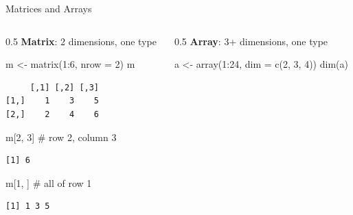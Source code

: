 \documentclass[
  ignorenonframetext,
  aspectratio=169,
]{beamer}
\newenvironment{Shaded}{\begin{snugshade}}{\end{snugshade}}
\newcommand{\AttributeTok}[1]{\textcolor[rgb]{0.40,0.45,0.13}{#1}}
\newcommand{\CommentTok}[1]{\textcolor[rgb]{0.37,0.37,0.37}{#1}}
\newcommand{\DecValTok}[1]{\textcolor[rgb]{0.68,0.00,0.00}{#1}}
\newcommand{\FunctionTok}[1]{\textcolor[rgb]{0.28,0.35,0.67}{#1}}
\newcommand{\NormalTok}[1]{\textcolor[rgb]{0.00,0.23,0.31}{#1}}
\newcommand{\OtherTok}[1]{\textcolor[rgb]{0.00,0.23,0.31}{#1}}
\newcommand{\SpecialCharTok}[1]{\textcolor[rgb]{0.37,0.37,0.37}{#1}}
\begin{document}
\begin{frame}[fragile]{Matrices and Arrays}
\protect\hypertarget{matrices-and-arrays}{}
\begin{columns}[T]
\begin{column}{0.5\textwidth}
\textbf{Matrix}: 2 dimensions, one type

\begin{Shaded}
\begin{Highlighting}[]
\NormalTok{m }\OtherTok{\textless{}{-}} \FunctionTok{matrix}\NormalTok{(}\DecValTok{1}\SpecialCharTok{:}\DecValTok{6}\NormalTok{, }\AttributeTok{nrow =} \DecValTok{2}\NormalTok{)}
\NormalTok{m}
\end{Highlighting}
\end{Shaded}

\begin{verbatim}
     [,1] [,2] [,3]
[1,]    1    3    5
[2,]    2    4    6
\end{verbatim}

\begin{Shaded}
\begin{Highlighting}[]
\NormalTok{m[}\DecValTok{2}\NormalTok{, }\DecValTok{3}\NormalTok{]     }\CommentTok{\# row 2, column 3}
\end{Highlighting}
\end{Shaded}

\begin{verbatim}
[1] 6
\end{verbatim}

\begin{Shaded}
\begin{Highlighting}[]
\NormalTok{m[}\DecValTok{1}\NormalTok{, ]      }\CommentTok{\# all of row 1}
\end{Highlighting}
\end{Shaded}

\begin{verbatim}
[1] 1 3 5
\end{verbatim}
\end{column}

\begin{column}{0.5\textwidth}
\textbf{Array}: 3+ dimensions, one type

\begin{Shaded}
\begin{Highlighting}[]
\NormalTok{a }\OtherTok{\textless{}{-}} \FunctionTok{array}\NormalTok{(}\DecValTok{1}\SpecialCharTok{:}\DecValTok{24}\NormalTok{, }\AttributeTok{dim =} \FunctionTok{c}\NormalTok{(}\DecValTok{2}\NormalTok{, }\DecValTok{3}\NormalTok{, }\DecValTok{4}\NormalTok{))}
\FunctionTok{dim}\NormalTok{(a)}
\end{Highlighting}
\end{Shaded}


\end{column}
\end{columns}
\end{frame}
\end{document}
